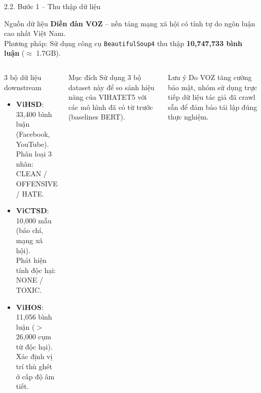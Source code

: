 \documentclass[11pt, aspectratio=169]{beamer}
\begin{document}
\begin{frame}[shrink=5]{2.2. Bước 1 -- Thu thập dữ liệu}

\begin{block}{Nguồn dữ liệu}
  \textbf{Diễn đàn VOZ} -- nền tảng mạng xã hội có tính tự do ngôn luận cao nhất Việt Nam.\\
  Phương pháp: Sử dụng công cụ \texttt{BeautifulSoup4} thu thập \textbf{10,747,733 bình luận} ($\approx$ 1.7GB).
\end{block}

\vspace{0.2cm}
\begin{columns}[T]
  \begin{block}{3 bộ dữ liệu downstream}
    \begin{itemize}
      \item \textbf{ViHSD}: 33,400 bình luận (Facebook, YouTube).\\
        Phân loại 3 nhãn: CLEAN / OFFENSIVE / HATE.
      \item \textbf{ViCTSD}: 10,000 mẫu (báo chí, mạng xã hội).\\
        Phát hiện tính độc hại: NONE / TOXIC.
      \item \textbf{ViHOS}: 11,056 bình luận ($>$26,000 cụm từ độc hại).\\
        Xác định vị trí thù ghét ở cấp độ âm tiết.
    \end{itemize}
  \end{block}

  \begin{block}{Mục đích}
    Sử dụng 3 bộ dataset này để so sánh hiệu năng của VIHATET5 với các mô hình đã có từ trước (baselines BERT).
  \end{block}

  \vspace{0.3cm}
  \begin{block}{Lưu ý}
    Do VOZ tăng cường bảo mật, nhóm sử dụng trực tiếp dữ liệu tác giả đã crawl sẵn để đảm bảo tái lập đúng thực nghiệm.
  \end{block}
\end{columns}
\end{frame}
\end{document}
